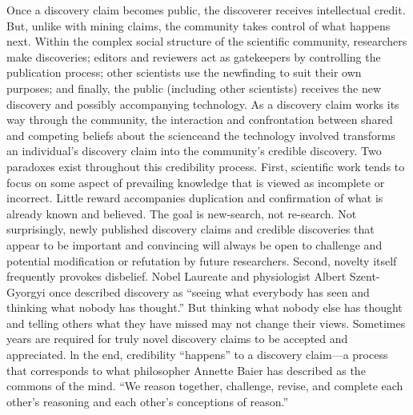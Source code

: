 Once a discovery claim becomes public, the discoverer receives intellectual credit. But, unlike with mining claims, the community takes control of what happens next. Within the complex social structure of the scientific community, researchers make discoveries; editors and reviewers act as gatekeepers by controlling the publication process; other scientists use the newfinding to suit their own purposes; and finally, the public (including other scientists) receives the new discovery and possibly accompanying technology. As a discovery claim works its way through the community, the interaction and confrontation between shared and competing beliefs about the scienceand the technology involved transforms an individual’s discovery claim into the community’s credible discovery.
Two paradoxes exist throughout this credibility process. First, scientific work tends to focus on some aspect of prevailing knowledge that is viewed as incomplete or incorrect. Little reward accompanies duplication and confirmation of what is already known and believed. The goal is new-search, not re-search. Not surprisingly, newly published discovery claims and credible discoveries that appear to be important and convincing will always be open to challenge and potential modification or refutation by future researchers. Second, novelty itself frequently provokes disbelief. Nobel Laureate and physiologist Albert Szent-Gyorgyi once described discovery as “seeing what everybody has seen and thinking what nobody has thought.” But thinking what nobody else has thought and telling others what they have missed may not change their views. Sometimes years are required for truly novel discovery claims to be accepted and appreciated.
ln the end, credibility “happens” to a discovery claim—a process that corresponds to what philosopher Annette Baier has described as the commons of the mind. “We reason together, challenge, revise, and complete each other’s reasoning and each other’s conceptions of reason.”

